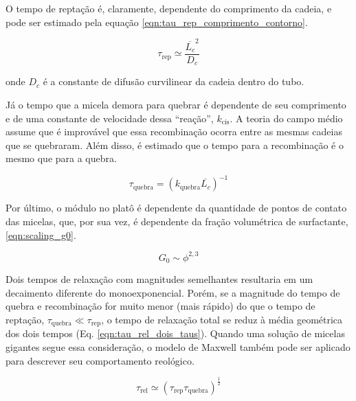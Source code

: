 		O tempo de reptação é, claramente, dependente do comprimento da cadeia, e pode ser estimado pela equação \ref{eqn:tau_rep_comprimento_contorno}.
		
		\begin{equation}
			\tau_\mathrm{rep} \simeq \frac{\overline{L_c}^2}{D_c}
			\label{eqn:tau_rep_comprimento_contorno}
		\end{equation} %
		
		\noindent onde \(D_c\) é a constante de difusão curvilinear da cadeia dentro do tubo.
		
		Já o tempo que a micela demora para quebrar é dependente de seu comprimento e de uma constante de velocidade dessa ``reação'', \(k_\mathrm{cis}\). A teoria do campo médio assume que é improvável que essa recombinação ocorra entre as mesmas cadeias que se quebraram. Além disso, é estimado que o tempo para a recombinação é o mesmo que para a quebra.
		
		\begin{equation}
			\tau_{\mathrm{quebra}} = \left(k_\mathrm{quebra}\overline{L_c}\right)^{-1}
			\label{eqn:tempo_quebra_comp_contorno}
		\end{equation} %
		
		
		Por último, o módulo no platô é dependente da quantidade de pontos de contato das micelas, que, por sua vez, é dependente da fração volumétrica de surfactante, \ref{eqn:scaling_g0}. 
		
		\begin{equation}
			G_0 \sim \phi^{2{,}3}  
			\label{eqn:scaling_g0}
		\end{equation} %
		
		Dois tempos de relaxação com magnitudes semelhantes resultaria em um decaimento diferente do monoexponencial. Porém, se a magnitude do tempo de quebra e recombinação for muito menor (mais rápido) do que o tempo de reptação, \( \tau_{\mathrm{quebra}} \ll \tau_\mathrm{rep} \), o tempo de relaxação total se reduz à média geométrica dos dois tempos (Eq. \ref{eqn:tau_rel_dois_taus}). Quando uma solução de micelas gigantes segue essa consideração, o modelo de Maxwell também pode ser aplicado para descrever seu comportamento reológico.  %
		
		\begin{equation}
			\tau_{\mathrm{rel}} \simeq \left( \tau_\mathrm{rep} \tau_\mathrm{quebra} \right) ^ \frac{1}{2}
			\label{eqn:tau_rel_dois_taus}
		\end{equation} 
		
